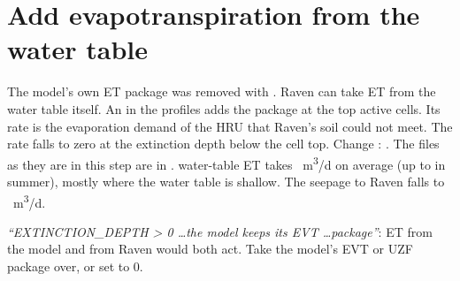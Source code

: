 \section{Add evapotranspiration from the water table}

\label{st:et}
The model's own ET package was removed with . Raven can take ET from the water table itself. An
 in the profiles adds the package  at the top active cells. Its rate is the
evaporation demand of the HRU that Raven's soil could not meet. The rate falls to zero at the extinction depth below the
cell top. Change :
\see {}. The files as they are in this step are in .
\why water-table ET takes ~m\textsuperscript{3}/d on average (up to  in summer), mostly where the
water table is shallow. The seepage to Raven falls to ~m\textsuperscript{3}/d.
\begin{trouble}
\emph{``EXTINCTION\_DEPTH > 0 \dots the model keeps its EVT \dots package''}: ET from the model and from Raven would both
act. Take the model's EVT or UZF package over, or set  to 0.
\end{trouble}
